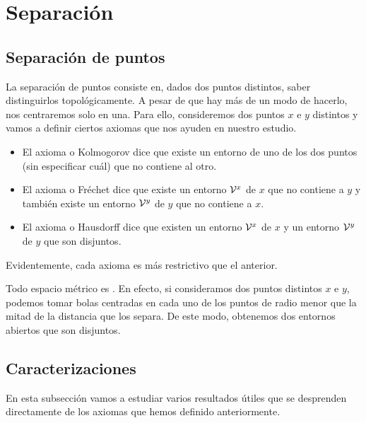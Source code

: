 \chapter{Separación}

\section{Separación de puntos} 

La separación de puntos consiste en, dados dos puntos distintos, saber distinguirlos topológicamente. A pesar de que hay más de un modo de hacerlo, nos centraremos solo en una. Para ello, consideremos dos puntos $x$ e $y$ distintos y vamos a definir ciertos axiomas que nos ayuden en nuestro estudio.

\begin{itemize}
\item El axioma \kolmogorov o Kolmogorov dice que existe un entorno de uno de los dos puntos (sin especificar cuál) que no contiene al otro.  
\item El axioma \frechet o Fréchet dice que existe un entorno $\mathcal{V}^x$ de $x$ que no contiene a $y$ y también existe un entorno $\mathcal{V}^y$ de $y$ que no contiene a $x$.  
\item El axioma \hausdorff o Hausdorff dice que existen un entorno $\mathcal{V}^x$ de $x$ y un entorno $\mathcal{V}^y$ de $y$ que son disjuntos.  
\end{itemize}

Evidentemente, cada axioma es más restrictivo que el anterior. 

\begin{obs}
Todo espacio métrico es \hausdorff. En efecto, si consideramos dos puntos distintos $x$ e $y$, podemos tomar bolas centradas en cada uno de los puntos de radio menor que la mitad de la distancia que los separa. De este modo, obtenemos dos entornos abiertos que son disjuntos. 
\end{obs}

\section{Caracterizaciones}

En esta subsección vamos a estudiar varios resultados útiles que se desprenden directamente de los axiomas que hemos definido anteriormente. 

